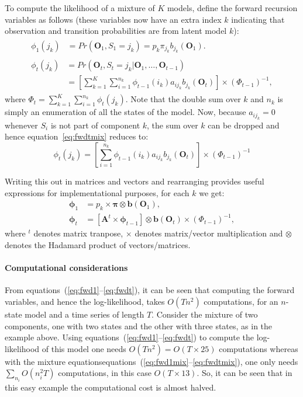 \documentclass[a4paper,12pt,doc]{apaIngmar} %
\newcommand{\mat}{\mathbf}
\newcommand{\vc}{\mathbf}
\begin{document}
To compute the likelihood of a mixture of $K$ models, define the
forward recursion variables as follows (these variables now have an
extra index $k$ indicating that observation and transition
probabilities are from latent model $k$):
\begin{align}
\begin{split}
\phi_{1}(j_{k}) &=  Pr(\vc{O}_{1}, 
S_{1}=j_{k})=p_{k}\pi_{j_{k}}b_{j_{k}}(\vc{O}_{1}).
\end{split}\label{eq:fwd1mix} \\
\begin{split}
\phi_{t}(j_{k})   &=   Pr(\vc{O}_{t}, S_{t}=j_{k}|\vc{O}_{1}, \ldots, 
\vc{O}_{t-1}) \\
			&= \left[ \sum_{k=1}^{K} \sum_{i=1}^{n_{k}} \phi_{t-1}(i_{k}) 
			a_{ij_{k}}b_{j_{k}}(\vc{O}_{t}) \right] \times (\Phi_{t-1})^{-1},
\end{split}\label{eq:fwdtmix} 
\end{align}
where $\Phi_{t} =  \sum_{k=1}^{K}\sum_{i=1}^{n_{k}} 
\phi_{t}(j_{k})$.  Note that the double sum over $k$ and $n_{k}$ is 
simply an enumeration of all the states of the model. Now, because 
$a_{ij_{k}}=0$ whenever $S_{i}$ is not part of component $k$, the sum 
over $k$ can be dropped and hence equation~\ref{eq:fwdtmix} reduces 
to:
\begin{equation}
	\phi_{t}(j_{k}) = \left[ \sum_{i=1}^{n_{k}} \phi_{t-1}(i_{k}) 
			a_{ij_{k}}b_{j_{k}}(\vc{O}_{t}) \right] \times (\Phi_{t-1})^{-1}
\end{equation}

Writing this out in matrices and vectors and rearranging provides 
useful expressions for implementational  purposes, for each $k$ we 
get:
\begin{align}
	\vc{\phi}_{1} &=  p_{k} \times \pmb{\pi} \otimes 
\vc{b}(\vc{O}_{1}),\\
	\vc{\phi}_{t} &= \left[ \mat{A}^{t} \times \pmb{\phi}_{t-1} \right ] 
		\otimes \vc{b} (\vc{O}_{t}) \times (\Phi_{t-1})^{-1},
\end{align}
where $^{t}$ denotes matrix tranpose, $\times$ denotes matrix/vector 
multiplication and $\otimes$ denotes the Hadamard product of 
vectors/matrices. 

\paragraph{Computational considerations} 
From equations~(\ref{eq:fwd1}--\ref{eq:fwdt}), it can be seen that
computing the forward variables, and hence the log-likelihood, takes
$O(Tn^{2})$ computations, for an $n$-state model and a time series of
length $T$.  Consider the mixture of two components, one with two
states and the other with three states, as in the example above.
Using equations~(\ref{eq:fwd1}--\ref{eq:fwdt}) to compute the
log-likelihood of this model one needs $O(Tn^{2})=O(T\times 25)$
computations whereas with the mixture
equationsequations~(\ref{eq:fwd1mix}--\ref{eq:fwdtmix}), one only
needs $\sum_{n_{i}} O(n_{i}^{2}T)$ computations, in this case $O(T
\times 13)$.  So, it can be seen that in this easy example the
computational cost is almost halved.
\end{document}
